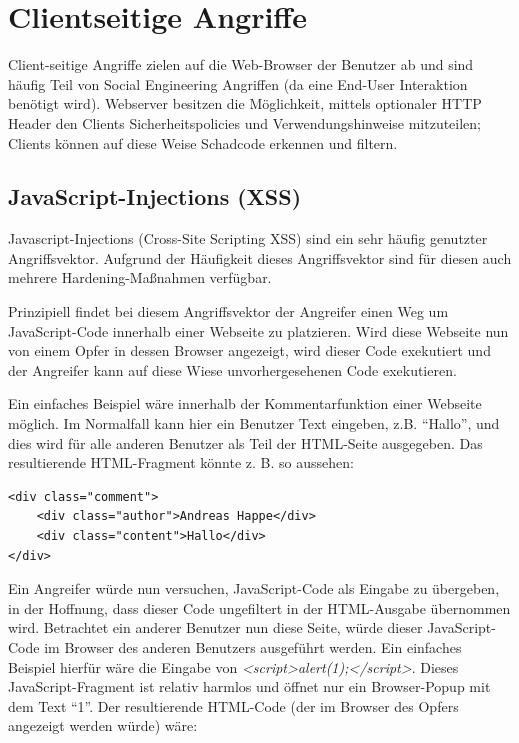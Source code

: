 \chapter{Clientseitige Angriffe}

Client-seitige Angriffe zielen auf die Web-Browser der Benutzer ab und sind häufig Teil von Social Engineering Angriffen (da eine End-User Interaktion benötigt wird). Webserver besitzen die Möglichkeit, mittels optionaler HTTP Header den Clients Sicherheitspolicies und Verwendungshinweise mitzuteilen; Clients können auf diese Weise Schadcode erkennen und filtern.

\section{JavaScript-Injections (XSS)}

Javascript-Injections (Cross-Site Scripting XSS) sind ein sehr häufig genutzter Angriffsvektor. Aufgrund der Häufigkeit dieses Angriffsvektor sind für diesen auch mehrere Hardening-Maßnahmen verfügbar.

Prinzipiell findet bei diesem Angriffsvektor der Angreifer einen Weg um JavaScript-Code innerhalb einer Webseite zu platzieren. Wird diese Webseite nun von einem Opfer in dessen Browser angezeigt, wird dieser Code exekutiert und der Angreifer kann auf diese Wiese unvorhergesehenen Code exekutieren.

Ein einfaches Beispiel wäre innerhalb der Kommentarfunktion einer Webseite möglich. Im Normalfall kann hier ein Benutzer Text eingeben, z.B. ``Hallo'', und dies wird für alle anderen Benutzer als Teil der HTML-Seite ausgegeben. Das resultierende HTML-Fragment könnte z. B. so aussehen:

\begin{verbatim}
<div class="comment">
	<div class="author">Andreas Happe</div>
	<div class="content">Hallo</div>
</div>
\end{verbatim}

Ein Angreifer würde nun versuchen, JavaScript-Code als Eingabe zu übergeben, in der Hoffnung, dass dieser Code ungefiltert in der HTML-Ausgabe übernommen wird. Betrachtet ein anderer Benutzer nun diese Seite, würde dieser JavaScript-Code im Browser des anderen Benutzers ausgeführt werden. Ein einfaches Beispiel hierfür wäre die Eingabe von \textit{<script>alert(1);</script>}. Dieses JavaScript-Fragment ist relativ harmlos und öffnet nur ein Browser-Popup mit dem Text ``1''. Der resultierende HTML-Code (der im Browser des Opfers angezeigt werden würde) wäre:

